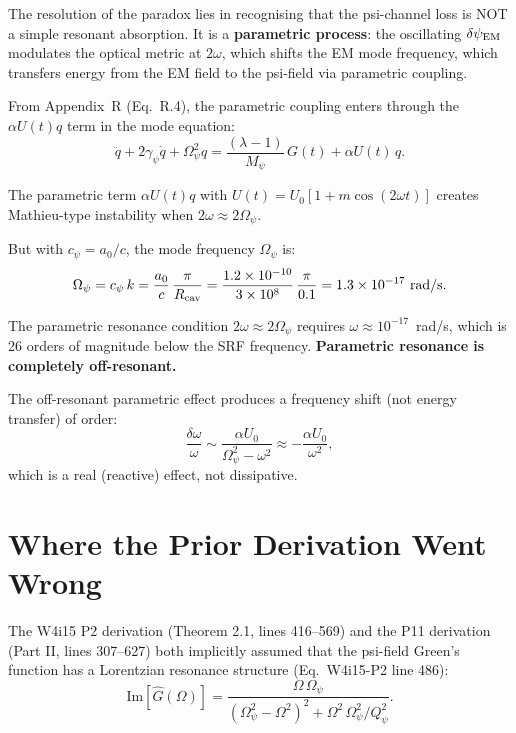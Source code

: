 \documentclass[11pt]{article}
\newcommand{\Qpsi}{Q_\psi}
\newcommand{\ee}[1]{\times 10^{#1}}
\newcommand{\Opsi}{\Omega_\psi}
\newcommand{\gpsi}{\gamma_\psi}
\newcommand{\Mpsi}{M_\psi}
\newcommand{\dpsiEM}{\delta\psi_{\rm EM}}
\theoremstyle{definition}
\theoremstyle{remark}
\begin{document}
The resolution of the paradox lies in recognising that the psi-channel
loss is NOT a simple resonant absorption. It is a \textbf{parametric
process}: the oscillating $\dpsiEM$ modulates the optical metric at
$2\omega$, which shifts the EM mode frequency, which transfers energy
from the EM field to the psi-field via parametric coupling.

From Appendix~R (Eq.~R.4), the parametric coupling enters through the
$\alpha U(t) q$ term in the mode equation:
\begin{equation}
\ddot{q} + 2\gpsi\dot{q} + \Opsi^2 q
= \frac{(\lambda - 1)}{\Mpsi}\,G(t) + \alpha U(t)\,q.
\end{equation}

The parametric term $\alpha U(t) q$ with $U(t) = U_0[1 + m\cos(2\omega
t)]$ creates Mathieu-type instability when $2\omega \approx 2\Opsi$.

But with $c_\psi = a_0/c$, the mode frequency $\Opsi$ is:
\begin{equation}
\Opsi = c_\psi\,k = \frac{a_0}{c}\,\frac{\pi}{R_{\rm cav}}
= \frac{1.2\ee{-10}}{3\ee{8}}\,\frac{\pi}{0.1}
= 1.3\ee{-17}~\text{rad/s}.
\end{equation}

The parametric resonance condition $2\omega \approx 2\Opsi$ requires
$\omega \approx 10^{-17}$~rad/s, which is 26 orders of magnitude
below the SRF frequency. \textbf{Parametric resonance is completely
off-resonant.}

The off-resonant parametric effect produces a frequency shift (not
energy transfer) of order:
\begin{equation}
\frac{\delta\omega}{\omega} \sim \frac{\alpha U_0}{\Opsi^2 - \omega^2}
\approx -\frac{\alpha U_0}{\omega^2},
\end{equation}
which is a real (reactive) effect, not dissipative.


\section{Where the Prior Derivation Went Wrong}
\label{sec:error}

The W4i15 P2 derivation (Theorem 2.1, lines 416--569) and the P11
derivation (Part II, lines 307--627) both implicitly assumed that
the psi-field Green's function has a Lorentzian resonance structure
(Eq.~W4i15-P2 line 486):
\begin{equation}
\text{Im}[\hat{G}(\Omega)] = \frac{\Omega\,\Opsi}
{(\Opsi^2 - \Omega^2)^2 + \Omega^2\,\Opsi^2/\Qpsi^2}.
\end{equation}
\end{document}
